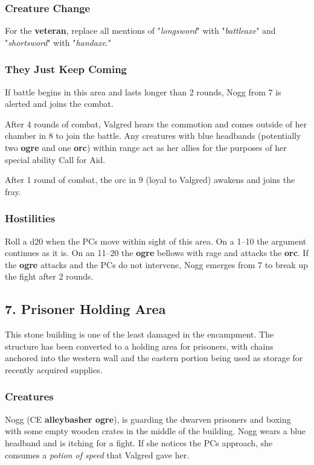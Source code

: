 \documentclass[10pt,a4paper,twoside,bg=print,twocolumn,openany,nodeprecatedcode]{dndbook}
\begin{document}
\subsubsection{Creature Change}
For the \textbf{veteran}, replace all mentions of "\textit{longsword}" with "\textit{battleaxe}" and "\textit{shortsword}" with "\textit{handaxe}."

\subsubsection{They Just Keep Coming}
If battle begins in this area and lasts longer than 2 rounds, Nogg from 7 is alerted and joins the combat.

After 4 rounds of combat, Valgred hears the commotion and comes outside of her chamber in 8 to join the battle. Any creatures with blue headbands (potentially two \textbf{ogre} and one \textbf{orc}) within range act as her allies for the purposes of her special ability Call for Aid.

After 1 round of combat, the orc in 9 (loyal to Valgred) awakens and joins the fray.

\subsubsection{Hostilities}
Roll a d20 when the PCs move within sight of this area. On a 1–10 the argument continues as it is. On an 11–20 the \textbf{ogre} bellows with rage and attacks the \textbf{orc}. If the \textbf{ogre} attacks and the PCs do not intervene, Nogg emerges from 7 to break up the fight after 2 rounds.

\subsection{7. Prisoner Holding Area}
\begin{DndReadAloud}{}
This stone building is one of the least damaged in the encampment. The structure has been converted to a holding area for prisoners, with chains anchored into the western wall and the eastern portion being used as storage for recently acquired supplies.

\end{DndReadAloud}

\subsubsection{Creatures}
Nogg (CE \textbf{alleybasher ogre}), is guarding the dwarven prisoners and boxing with some empty wooden crates in the middle of the building. Nogg wears a blue headband and is itching for a fight. If she notices the PCs approach, she consumes a \textit{potion of speed} that Valgred gave her.
\end{document}
